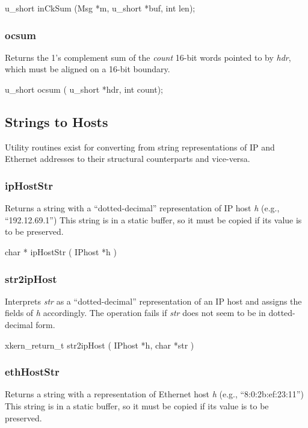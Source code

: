{\sem u\_short} {\bold inCkSum} ({\sem Msg} *{\caps m}, {\sem u\_short} *{\caps buf}, {\sem int} {\caps len});

\subsubsection{ocsum}

Returns the 1's complement sum of the {\em count} 16-bit words pointed
to by {\em hdr}, which must be aligned on a 16-bit boundary.
\medskip

{\sem u\_short} {\bold ocsum} ( {\sem u\_short} *{\caps hdr}, {\sem int} {\caps count});


\subsection{Strings to Hosts}

Utility routines exist for converting from string representations of
IP and Ethernet addresses to their structural counterparts and
vice-versa.  

\subsubsection{ipHostStr}

Returns a string with a ``dotted-decimal'' representation of IP host 
{\em h} (e.g., ``192.12.69.1'')  
This string is in a static buffer, so it must be copied if
its value is to be preserved.
\medskip

{\sem char *} {\bold ipHostStr} ( {\sem IPhost} *{\caps h} )


\subsubsection{str2ipHost}

Interprets {\em str} as a ``dotted-decimal'' 
representation of an IP host and assigns the fields of 
{\em h} accordingly.  The operation fails if {\em str} does not seem
to be in dotted-decimal form.
\medskip

{\sem xkern\_return\_t} {\bold str2ipHost} 
( {\sem IPhost} *{\caps h}, {\sem char } *{\caps str} )


\subsubsection{ethHostStr}

Returns a string with a representation of Ethernet host 
{\em h} (e.g., ``8:0:2b:ef:23:11'')  
This string is in a static buffer, so it must be copied if
its value is to be preserved.
\medskip

